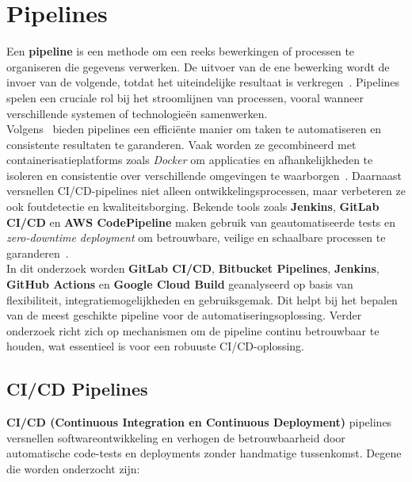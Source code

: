 \newpage

\section{Pipelines}%
\label{sec:pipelines}

Een \textbf{pipeline} is een methode om een reeks bewerkingen of processen te organiseren die gegevens verwerken. De uitvoer van de ene bewerking wordt de invoer van de volgende, totdat het uiteindelijke resultaat is verkregen~\autocite{pythonPipelinesThakur}. Pipelines spelen een cruciale rol bij het stroomlijnen van processen, vooral wanneer verschillende systemen of technologieën samenwerken.\\

Volgens~\autocite{thesusVirtanen} bieden pipelines een efficiënte manier om taken te automatiseren en consistente resultaten te garanderen. Vaak worden ze gecombineerd met containerisatieplatforms zoals \textit{Docker} om applicaties en afhankelijkheden te isoleren en consistentie over verschillende omgevingen te waarborgen~\autocite{ijrasetCICDPipeline}. Daarnaast versnellen CI/CD-pipelines niet alleen ontwikkelingsprocessen, maar verbeteren ze ook foutdetectie en kwaliteitsborging. Bekende tools zoals \textbf{Jenkins}, \textbf{GitLab CI/CD} en \textbf{AWS CodePipeline} maken gebruik van geautomatiseerde tests en \textit{zero-downtime deployment} om betrouwbare, veilige en schaalbare processen te garanderen~\autocite{ijrasetFileServe}.\\

In dit onderzoek worden \textbf{GitLab CI/CD}, \textbf{Bitbucket Pipelines}, \textbf{Jenkins}, \textbf{GitHub Actions} en \textbf{Google Cloud Build} geanalyseerd op basis van flexibiliteit, integratiemogelijkheden en gebruiksgemak. Dit helpt bij het bepalen van de meest geschikte pipeline voor de automatiseringsoplossing. Verder onderzoek richt zich op mechanismen om de pipeline continu betrouwbaar te houden, wat essentieel is voor een robuuste CI/CD-oplossing.

\subsection{CI/CD Pipelines}
\textbf{CI/CD (Continuous Integration en Continuous Deployment)} pipelines versnellen softwareontwikkeling en verhogen de betrouwbaarheid door automatische code-tests en deployments zonder handmatige tussenkomst. Degene die worden onderzocht zijn:

